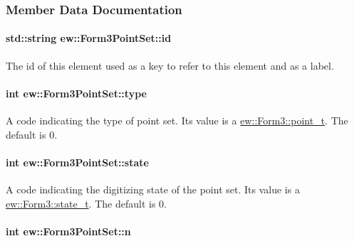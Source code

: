 \subsubsection{Member Data Documentation}
\hypertarget{classew_1_1Form3PointSet_ac0dbd3aacae1fb9347d71880ea37f55c}{
\paragraph[{id}]{\setlength{\rightskip}{0pt plus 5cm}std::string {\bf ew::Form3PointSet::id}}\hfill}
\label{classew_1_1Form3PointSet_ac0dbd3aacae1fb9347d71880ea37f55c}
The id of this element used as a key to refer to this element and as a label. \hypertarget{classew_1_1Form3PointSet_ada976df73c605ebb9a845a915531a566}{
\paragraph[{type}]{\setlength{\rightskip}{0pt plus 5cm}int {\bf ew::Form3PointSet::type}}\hfill}
\label{classew_1_1Form3PointSet_ada976df73c605ebb9a845a915531a566}
A code indicating the type of point set. Its value is a \hyperlink{classew_1_1Form3_abfa10aaae60c2888a7e201cd8fd45733}{ew::Form3::point\_\-t}. The default is 0. \hypertarget{classew_1_1Form3PointSet_a1e020b47b7a87202ef42362843794f7f}{
\paragraph[{state}]{\setlength{\rightskip}{0pt plus 5cm}int {\bf ew::Form3PointSet::state}}\hfill}
\label{classew_1_1Form3PointSet_a1e020b47b7a87202ef42362843794f7f}
A code indicating the digitizing state of the point set. Its value is a \hyperlink{classew_1_1Form3_a0fb1f90f8936fc647de8bf351aa0f725}{ew::Form3::state\_\-t}. The default is 0. \hypertarget{classew_1_1Form3PointSet_a5bebf378e3fa2c68be2c002e216e9302}{
\paragraph[{n}]{\setlength{\rightskip}{0pt plus 5cm}int {\bf ew::Form3PointSet::n}}\hfill}
\label{classew_1_1Form3PointSet_a5bebf378e3fa2c68be2c002e216e9302}
